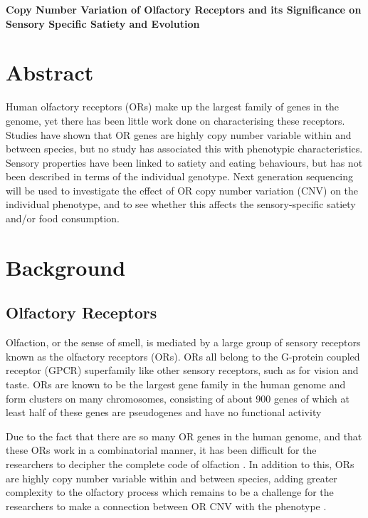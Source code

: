 \documentclass[a4paper, 12pt]{article}
\begin{document}
\begin{center}
    \Large{\textbf{Copy Number Variation of Olfactory Receptors and its Significance on Sensory Specific Satiety and Evolution}}
\end{center}

\section*{Abstract}

Human olfactory receptors (ORs) make up the largest family of genes in the genome, yet there has been little work done on characterising these receptors.
Studies have shown that OR genes are highly copy number variable within and between species, but no study has associated this with phenotypic characteristics.
Sensory properties have been linked to satiety and eating behaviours, but has not been described in terms of the individual genotype.
Next generation sequencing will be used to investigate the effect of OR copy number variation (CNV) on the individual phenotype, and to see whether this affects the sensory-specific satiety and/or food consumption.

\section*{Background}

\subsection*{Olfactory Receptors}

Olfaction, or the sense of smell, is mediated by a large group of sensory receptors known as the olfactory receptors (ORs).
ORs all belong to the G-protein coupled receptor (GPCR) superfamily like other sensory receptors, such as for vision and taste.
ORs are known to be the largest gene family in the human genome and form clusters on many chromosomes, consisting of about 900 genes of which at least half of these genes are pseudogenes and have no functional activity \citep{Glusman2001,Niimura2005}

Due to the fact that there are so many OR genes in the human genome, and that these ORs work in a combinatorial manner, it has been difficult for the researchers to decipher the complete code of olfaction \citep{Hasin-Brumshtein2009, Nei2008}.
In addition to this, ORs are highly copy number variable within and between species, adding greater complexity to the olfactory process which remains to be a challenge for the researchers to make a connection between OR CNV with the phenotype \citep{Nozawa2007}.
\end{document}
